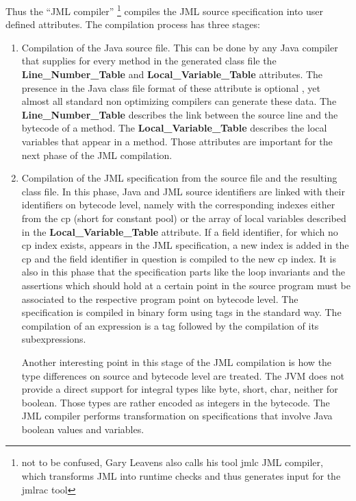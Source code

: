 Thus the ``JML compiler'' \footnote{not to be confused, Gary Leavens also calls his tool jmlc JML compiler, which transforms JML into runtime checks and thus generates input for the jmlrac tool  } compiles the JML source specification into user defined attributes. The compilation process has three stages:
\begin{enumerate}
\item Compilation of the Java source file. This can be done by any Java compiler that supplies for every method in the generated class file 
the \textbf{Line\_Number\_Table} and \textbf{Local\_Variable\_Table}  attributes. The presence in the Java class file format of 
these attribute is optional \cite{VMSpec}, yet almost all standard non optimizing compilers can generate these data. 
The \textbf{Line\_Number\_Table} describes the link between the source line and the bytecode of a method.  
The \textbf{Local\_Variable\_Table} describes the local variables that appear in a method. 
Those attributes are important for the next phase of the JML compilation.
\item Compilation of the JML specification from the source file and the resulting class file. In this phase, Java and JML source identifiers are 
linked with their identifiers on bytecode level, namely with the corresponding indexes either from the cp (short for constant pool) or the array of 
local variables described in the \textbf{Local\_Variable\_Table} attribute. If a field
identifier, for which no cp index exists, appears in the JML specification, a new index is added in the cp and the field identifier in question
is compiled to the new cp index. It is also in this phase that the specification parts like the loop invariants and the assertions which should hold at a certain point in the source program must be associated to the respective program point on bytecode level. The specification
is compiled in binary form using tags in the standard way. The compilation of an expression is a tag followed by the compilation of its subexpressions. 

Another interesting point in this stage of the JML compilation is how the type differences on source and bytecode level are treated. 
The JVM does not provide a direct support for integral types like byte, short, char, neither for boolean.
 Those types are rather encoded as integers in the bytecode. The JML compiler performs transformation on specifications that involve Java boolean values and variables.



\end{enumerate}
